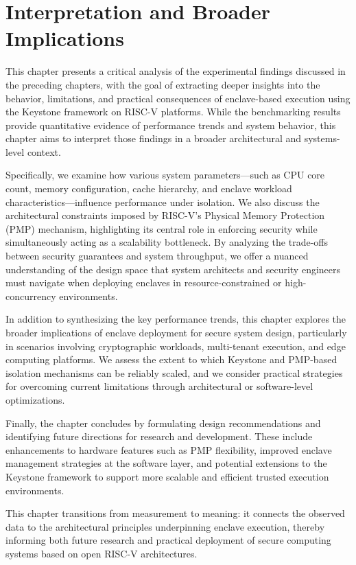 \chapter{Interpretation and Broader Implications}
\label{chap:discussion}

This chapter presents a critical analysis of the experimental findings discussed in the preceding chapters, with the goal of extracting deeper insights into the behavior, limitations, and practical consequences of enclave-based execution using the Keystone framework on RISC-V platforms. While the benchmarking results provide quantitative evidence of performance trends and system behavior, this chapter aims to interpret those findings in a broader architectural and systems-level context.

Specifically, we examine how various system parameters—such as CPU core count, memory configuration, cache hierarchy, and enclave workload characteristics—influence performance under isolation. We also discuss the architectural constraints imposed by RISC-V's Physical Memory Protection (PMP) mechanism, highlighting its central role in enforcing security while simultaneously acting as a scalability bottleneck. By analyzing the trade-offs between security guarantees and system throughput, we offer a nuanced understanding of the design space that system architects and security engineers must navigate when deploying enclaves in resource-constrained or high-concurrency environments.

In addition to synthesizing the key performance trends, this chapter explores the broader implications of enclave deployment for secure system design, particularly in scenarios involving cryptographic workloads, multi-tenant execution, and edge computing platforms. We assess the extent to which Keystone and PMP-based isolation mechanisms can be reliably scaled, and we consider practical strategies for overcoming current limitations through architectural or software-level optimizations.

Finally, the chapter concludes by formulating design recommendations and identifying future directions for research and development. These include enhancements to hardware features such as PMP flexibility, improved enclave management strategies at the software layer, and potential extensions to the Keystone framework to support more scalable and efficient trusted execution environments.

This chapter transitions from measurement to meaning: it connects the observed data to the architectural principles underpinning enclave execution, thereby informing both future research and practical deployment of secure computing systems based on open RISC-V architectures.

